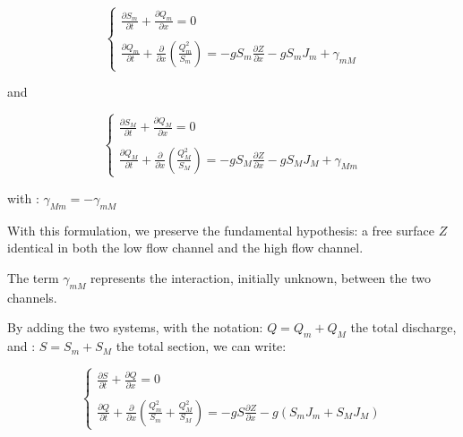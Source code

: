 \begin{equation}
 \left \lbrace
  \begin{array}{l}
    \frac{\partial{S_m}}{\partial{t}} + \frac{\partial{Q_m}}{\partial{x}} = 0 \\
    \\
    \frac{\partial{Q_m}}{\partial{t}} + \frac{\partial}{\partial{x}} \left ( \frac{Q_{m}^2}{S_m} \right ) = -g S_m \frac{\partial{Z}}{\partial{x}} - g S_m J_m + \gamma_{mM}
  \end{array}
 \right.
\end{equation}

and

\begin{equation}
 \left \lbrace
  \begin{array}{l}
    \frac{\partial{S_M}}{\partial{t}} + \frac{\partial{Q_M}}{\partial{x}} = 0 \\
    \\
    \frac{\partial{Q_M}}{\partial{t}} + \frac{\partial}{\partial{x}} \left ( \frac{Q_{M}^2}{S_M} \right ) = -g S_M \frac{\partial{Z}}{\partial{x}} - g S_M J_M + \gamma_{Mm}
  \end{array}
 \right.
\end{equation}

with : $\gamma_{Mm} = -\gamma_{mM}$

\vspace{0.5cm}

With this formulation, we preserve the fundamental hypothesis: a free surface $Z$ identical in both the low flow channel and the high flow channel.

\vspace{0.5cm}

The term $\gamma_{mM}$ represents the interaction, initially unknown, between the two channels.
\vspace{0.5cm}

By adding the two systems, with the notation: $Q = Q_m + Q_M$ the total discharge, and : $S = S_m + S_M$ the total section, we can write:

\begin{equation}
 \label{sysGlob}
 \left \lbrace
  \begin{array}{l}
    \frac{\partial{S}}{\partial{t}} + \frac{\partial{Q}}{\partial{x}} = 0 \\
    \\
    \frac{\partial{Q}}{\partial{t}} + \frac{\partial}{\partial{x}} \left ( \frac{Q_{m}^2}{S_m} + \frac{Q_{M}^2}{S_M} \right ) = -g S \frac{\partial{Z}}{\partial{x}} - g ( S_m J_m + S_M J_M )
  \end{array}
 \right.
\end{equation}

